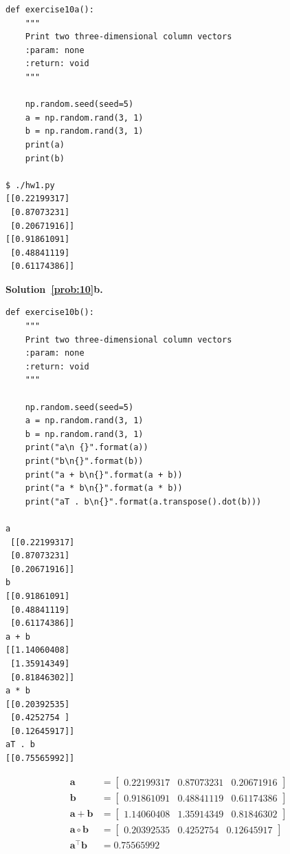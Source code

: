 \documentclass[10pt]{article}
\begin{document}
\begin{enumerate}
\begin{verbatim}
def exercise10a():
    """
    Print two three-dimensional column vectors
    :param: none
    :return: void
    """

    np.random.seed(seed=5)
    a = np.random.rand(3, 1)
    b = np.random.rand(3, 1)
    print(a)
    print(b)
    
$ ./hw1.py
[[0.22199317]
 [0.87073231]
 [0.20671916]]
[[0.91861091]
 [0.48841119]
 [0.61174386]]
\end{verbatim}

{\bf Solution~\ref{prob:10}b.} 

\begin{verbatim}
def exercise10b():
    """
    Print two three-dimensional column vectors
    :param: none
    :return: void
    """

    np.random.seed(seed=5)
    a = np.random.rand(3, 1)
    b = np.random.rand(3, 1)
    print("a\n {}".format(a))
    print("b\n{}".format(b))
    print("a + b\n{}".format(a + b))
    print("a * b\n{}".format(a * b))
    print("aT . b\n{}".format(a.transpose().dot(b)))

a
 [[0.22199317]
 [0.87073231]
 [0.20671916]]
b
[[0.91861091]
 [0.48841119]
 [0.61174386]]
a + b
[[1.14060408]
 [1.35914349]
 [0.81846302]]
a * b
[[0.20392535]
 [0.4252754 ]
 [0.12645917]]
aT . b
[[0.75565992]]
\end{verbatim}

\begin{equation}
\begin{aligned} 
  \mathbf{a} &= 
  \begin{bmatrix}
  0.22199317 & 0.87073231 & 0.20671916
  \end{bmatrix}
  \\
  \mathbf{b} &= 
  \begin{bmatrix}
  0.91861091 & 0.48841119 & 0.61174386
  \end{bmatrix}
  \\
  \mathbf{a} + \mathbf{b} &= 
  \begin{bmatrix}
  1.14060408 & 1.35914349 & 0.81846302
  \end{bmatrix}
  \\
  \mathbf{a} \circ \mathbf{b} &=
  \begin{bmatrix}
  0.20392535 & 0.4252754 & 0.12645917
  \end{bmatrix}
  \\
  \mathbf{a}^\top \mathbf{b} &= 0.75565992
\end{aligned}
\end{equation}



\end{enumerate}
\end{document}
